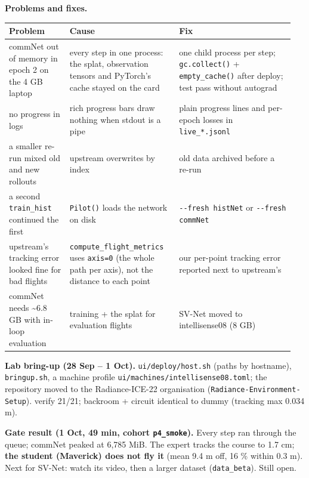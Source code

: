 \documentclass[11pt,a4paper]{article}
\newcommand{\code}[1]{\texttt{#1}}
\begin{document}
\textbf{Problems and fixes.}

\begin{center}\small
\begin{tabular}{@{}>{\raggedright\arraybackslash}p{0.201\linewidth}>{\raggedright\arraybackslash}p{0.364\linewidth}>{\raggedright\arraybackslash}p{0.383\linewidth}@{}}
\toprule
\textbf{Problem} & \textbf{Cause} & \textbf{Fix} \\
\midrule
commNet out of memory in epoch 2 on the 4 GB laptop & every step in one process: the splat, observation tensors and PyTorch's cache stayed on the card & one child process per step; \code{gc.collect()} + \code{empty\_\allowbreak{}cache()} after deploy; test pass without autograd \\
no progress in logs & rich progress bars draw nothing when stdout is a pipe & plain progress lines and per-epoch losses in \code{live\_\allowbreak{}*.jsonl} \\
a smaller re-run mixed old and new rollouts & upstream overwrites by index & old data archived before a re-run \\
a second \code{train\_\allowbreak{}hist} continued the first & \code{Pilot()} loads the network on disk & \code{-{}-fresh histNet} or \code{-{}-fresh commNet} \\
upstream's tracking error looked fine for bad flights & \code{compute\_\allowbreak{}flight\_\allowbreak{}metrics} uses \code{axis=0} (the whole path per axis), not the distance to each point & our per-point tracking error reported next to upstream's \\
commNet needs \textasciitilde{}6.8 GB with in-loop evaluation & training + the splat for evaluation flights & SV-Net moved to intellisense08 (8 GB) \\
\bottomrule
\end{tabular}
\end{center}
\textbf{Lab bring-up (28 Sep – 1 Oct).} \code{ui/\allowbreak{}deploy/\allowbreak{}host.sh} (paths by hostname), \code{bringup.sh}, a machine profile \code{ui/\allowbreak{}machines/\allowbreak{}intellisense08.toml}; the repository moved to the Radiance-ICE-22 organisation (\code{Radiance-Environment-Setup}). verify 21/21; backroom + circuit identical to dummy (tracking max 0.034 m).

\textbf{Gate result (1 Oct, 49 min, cohort \code{p4\_\allowbreak{}smoke}).} Every step ran through the queue; commNet peaked at 6,785 MiB. The expert tracks the course to 1.7 cm; \textbf{the student (Maverick) does not fly it} (mean 9.4 m off, 16 \% within 0.3 m). Next for SV-Net: watch its video, then a larger dataset (\code{data\_\allowbreak{}beta}). Still open.
\end{document}
